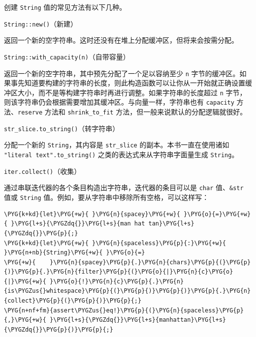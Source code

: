 创建 \texttt{String} 值的常见方法有以下几种。

\begin{mySidenote}
\texttt{String::new()}（新建）
\end{mySidenote}

返回一个新的空字符串。这时还没有在堆上分配缓冲区，但将来会按需分配。

\begin{myNote}
\texttt{String::with\_capacity(n)}（自带容量）
\end{myNote}

返回一个新的空字符串，其中预先分配了一个足以容纳至少 \texttt{n} 字节的缓冲区。如果事先知道要构建的字符串的长度，则此构造函数可以让你从一开始就正确设置缓冲区大小，而不是等构建字符串时再进行调整。如果字符串的长度超过 \texttt{n} 字节，则该字符串仍会根据需要增加其缓冲区。与向量一样，字符串也有 \texttt{capacity} 方法、\texttt{reserve} 方法和 \texttt{shrink\_to\_fit} 方法，但一般来说默认的分配逻辑就很好。

\begin{myNote}
\texttt{str\_slice.to\_string()}（转字符串）
\end{myNote}

分配一个新的 \texttt{String}，其内容是 \texttt{str\_slice} 的副本。本书一直在使用诸如 \texttt{"literal text".to\_string()} 之类的表达式来从字符串字面量生成 \texttt{String}。

\begin{mySidenote}
\texttt{iter.collect()}（收集）
\end{mySidenote}

通过串联迭代器的各个条目构造出字符串，迭代器的条目可以是 \texttt{char} 值、\texttt{\&str} 值或 \texttt{String} 值。例如，要从字符串中移除所有空格，可以这样写：

\begin{Verbatim}[commandchars=\\\{\},breaklines=true,breakanywhere=true,fontsize=\codefont,xleftmargin=17bp]
\PYG{k+kd}{let}\PYG{+w}{ }\PYG{n}{spacey}\PYG{+w}{ }\PYG{o}{=}\PYG{+w}{ }\PYG{l+s}{\PYGZdq{}}\PYG{l+s}{man hat tan}\PYG{l+s}{\PYGZdq{}}\PYG{p}{;}
\PYG{k+kd}{let}\PYG{+w}{ }\PYG{n}{spaceless}\PYG{p}{:}\PYG{+w}{ }\PYG{n+nb}{String}\PYG{+w}{ }\PYG{o}{=}
\PYG{+w}{    }\PYG{n}{spacey}\PYG{p}{.}\PYG{n}{chars}\PYG{p}{(}\PYG{p}{)}\PYG{p}{.}\PYG{n}{filter}\PYG{p}{(}\PYG{o}{|}\PYG{n}{c}\PYG{o}{|}\PYG{+w}{ }\PYG{o}{!}\PYG{n}{c}\PYG{p}{.}\PYG{n}{is\PYGZus{}whitespace}\PYG{p}{(}\PYG{p}{)}\PYG{p}{)}\PYG{p}{.}\PYG{n}{collect}\PYG{p}{(}\PYG{p}{)}\PYG{p}{;}
\PYG{n+nf+fm}{assert\PYGZus{}eq!}\PYG{p}{(}\PYG{n}{spaceless}\PYG{p}{,}\PYG{+w}{ }\PYG{l+s}{\PYGZdq{}}\PYG{l+s}{manhattan}\PYG{l+s}{\PYGZdq{}}\PYG{p}{)}\PYG{p}{;}
\end{Verbatim}

